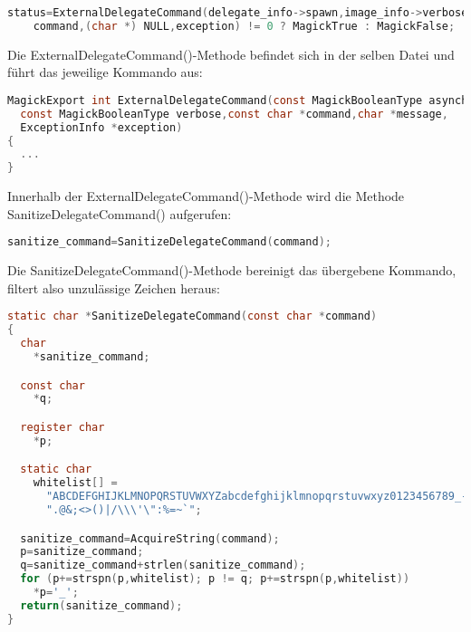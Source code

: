 \begin{lstlisting}[firstnumber=1301, language=C, caption=magick/delegate.c Aufruf ExternalDelegateCommand(),label={lst:lstlisting}]
  status=ExternalDelegateCommand(delegate_info->spawn,image_info->verbose,
    command,(char *) NULL,exception) != 0 ? MagickTrue : MagickFalse;
\end{lstlisting}
\vspace{5mm}

Die ExternalDelegateCommand()-Methode befindet sich in der selben Datei und führt das jeweilige Kommando aus:\\

\begin{lstlisting}[firstnumber=346, language=C, caption=magick/delegate.c ExternalDelegateCommand(),label={lst:lstlisting}]
MagickExport int ExternalDelegateCommand(const MagickBooleanType asynchronous,
  const MagickBooleanType verbose,const char *command,char *message,
  ExceptionInfo *exception)
{
  ...
}
\end{lstlisting}
\vspace{5mm}

Innerhalb der ExternalDelegateCommand()-Methode wird die Methode SanitizeDelegateCommand() aufgerufen:\\

\begin{lstlisting}[firstnumber=395, language=C, caption=magick/delegate.c Aufruf SanitizeDelegateCommand(),label={lst:lstlisting}]
  sanitize_command=SanitizeDelegateCommand(command);
\end{lstlisting}
\vspace{5mm}

Die SanitizeDelegateCommand()-Methode bereinigt das übergebene Kommando, filtert also unzulässige Zeichen heraus:\\

\begin{lstlisting}[firstnumber=322, language=C, caption=magick/delegate.c SanitizieDelegateCommand(),label={lst:lstlisting}]
static char *SanitizeDelegateCommand(const char *command)
{
  char
    *sanitize_command;

  const char
    *q;

  register char
    *p;

  static char
    whitelist[] =
      "ABCDEFGHIJKLMNOPQRSTUVWXYZabcdefghijklmnopqrstuvwxyz0123456789_- "
      ".@&;<>()|/\\\'\":%=~`";

  sanitize_command=AcquireString(command);
  p=sanitize_command;
  q=sanitize_command+strlen(sanitize_command);
  for (p+=strspn(p,whitelist); p != q; p+=strspn(p,whitelist))
    *p='_';
  return(sanitize_command);
}
\end{lstlisting}
\vspace{5mm}


